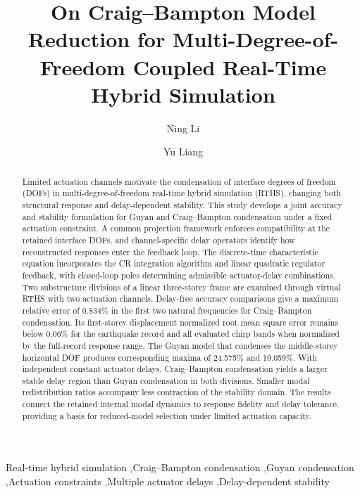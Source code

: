 \documentclass[a4paper,fleqn,review,12pt]{cas-sc}
\numberwithin{equation}{section}
\begin{document}
\let\WriteBookmarks\relax
\def\floatpagepagefraction{1}
\def\textpagefraction{.001}

\title[mode=title]{On Craig--Bampton Model Reduction for Multi-Degree-of-Freedom Coupled Real-Time Hybrid Simulation}

\author{Ning Li}
\author{Yu Liang}

\begin{abstract}
Limited actuation channels motivate the condensation of interface degrees of freedom (DOFs) in multi-degree-of-freedom real-time hybrid simulation (RTHS), changing both structural response and delay-dependent stability.
This study develops a joint accuracy and stability formulation for Guyan and Craig--Bampton condensation under a fixed actuation constraint.
A common projection framework enforces compatibility at the retained interface DOFs, and channel-specific delay operators identify how reconstructed responses enter the feedback loop.
The discrete-time characteristic equation incorporates the CR integration algorithm and linear quadratic regulator feedback, with closed-loop poles determining admissible actuator-delay combinations.
Two substructure divisions of a linear three-storey frame are examined through virtual RTHS with two actuation channels.
Delay-free accuracy comparisons give a maximum relative error of 0.834\% in the first two natural frequencies for Craig--Bampton condensation.
Its first-storey displacement normalized root mean square error remains below 0.06\% for the earthquake record and all evaluated chirp bands when normalized by the full-record response range.
The Guyan model that condenses the middle-storey horizontal DOF produces corresponding maxima of 24.575\% and 19.059\%.
With independent constant actuator delays, Craig--Bampton condensation yields a larger stable delay region than Guyan condensation in both divisions.
Smaller modal redistribution ratios accompany less contraction of the stability domain.
The results connect the retained internal modal dynamics to response fidelity and delay tolerance, providing a basis for reduced-model selection under limited actuation capacity.

\end{abstract}

\begin{keywords}
	\raggedright
	Real-time hybrid simulation
	\sep Craig--Bampton condensation
	\sep Guyan condensation
	\sep Actuation constraints
	\sep Multiple actuator delays
	\sep Delay-dependent stability
\end{keywords}
\end{document}
